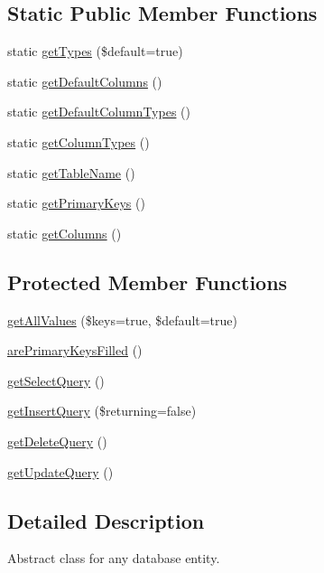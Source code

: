 \subsection*{Static Public Member Functions}
\begin{DoxyCompactItemize}
\item 
static \hyperlink{classEntity_aa496a11969dfae2753cfa2a8b5c8e53e}{getTypes} (\$default=true)
\item 
static \hyperlink{classEntity_a828b6c093a3ffeb5d1828fb539b4c001}{getDefaultColumns} ()
\item 
static \hyperlink{classEntity_af257dd951ed9b221a1d1efd45ea51db3}{getDefaultColumnTypes} ()
\item 
static \hyperlink{classEntity_ad69437219c10955803707fbf6ac458e7}{getColumnTypes} ()
\item 
static \hyperlink{classEntity_a8305fd94740ac62cbafb9de76567ce37}{getTableName} ()
\item 
static \hyperlink{classEntity_a61bbfbb4058427174e002a09ddc77c41}{getPrimaryKeys} ()
\item 
static \hyperlink{classEntity_a394717a08ffd54ec9a14d06727c86719}{getColumns} ()
\end{DoxyCompactItemize}
\subsection*{Protected Member Functions}
\begin{DoxyCompactItemize}
\item 
\hyperlink{classEntity_a8ac249c9942d8c9d9886c3b08c2389e7}{getAllValues} (\$keys=true, \$default=true)
\item 
\hyperlink{classEntity_abb502198e82d7770d9ac677152a5b958}{arePrimaryKeysFilled} ()
\item 
\hyperlink{classEntity_a6bca84b179145567662ee6441c27ac18}{getSelectQuery} ()
\item 
\hyperlink{classEntity_a48b7255175241170f98b9f2601243b48}{getInsertQuery} (\$returning=false)
\item 
\hyperlink{classEntity_a9ebe24129b06509e5dc66e75c3df5396}{getDeleteQuery} ()
\item 
\hyperlink{classEntity_ae66be26f01323911fbb59dc3a135dbf8}{getUpdateQuery} ()
\end{DoxyCompactItemize}


\subsection{Detailed Description}
Abstract class for any database entity. 

